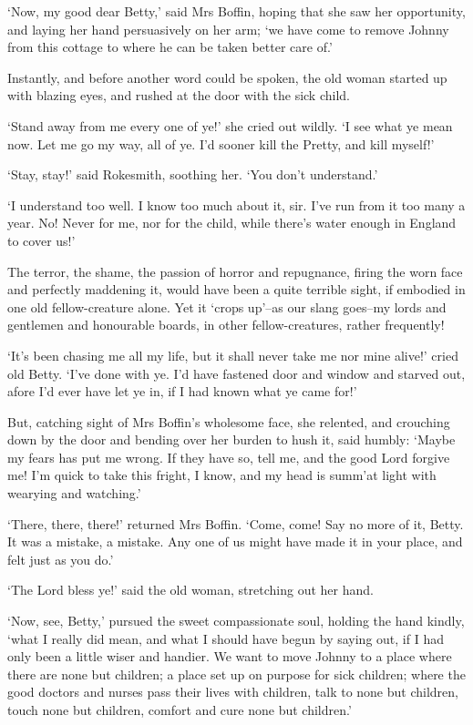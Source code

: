 ‘Now, my good dear Betty,’ said Mrs Boffin, hoping that she saw her
opportunity, and laying her hand persuasively on her arm; ‘we have come
to remove Johnny from this cottage to where he can be taken better care
of.’

Instantly, and before another word could be spoken, the old woman
started up with blazing eyes, and rushed at the door with the sick
child.

‘Stand away from me every one of ye!’ she cried out wildly. ‘I see what
ye mean now. Let me go my way, all of ye. I’d sooner kill the Pretty,
and kill myself!’

‘Stay, stay!’ said Rokesmith, soothing her. ‘You don’t understand.’

‘I understand too well. I know too much about it, sir. I’ve run from
it too many a year. No! Never for me, nor for the child, while there’s
water enough in England to cover us!’

The terror, the shame, the passion of horror and repugnance, firing the
worn face and perfectly maddening it, would have been a quite terrible
sight, if embodied in one old fellow-creature alone. Yet it ‘crops
up’--as our slang goes--my lords and gentlemen and honourable boards, in
other fellow-creatures, rather frequently!

‘It’s been chasing me all my life, but it shall never take me nor mine
alive!’ cried old Betty. ‘I’ve done with ye. I’d have fastened door and
window and starved out, afore I’d ever have let ye in, if I had known
what ye came for!’

But, catching sight of Mrs Boffin’s wholesome face, she relented, and
crouching down by the door and bending over her burden to hush it, said
humbly: ‘Maybe my fears has put me wrong. If they have so, tell me, and
the good Lord forgive me! I’m quick to take this fright, I know, and my
head is summ’at light with wearying and watching.’

‘There, there, there!’ returned Mrs Boffin. ‘Come, come! Say no more of
it, Betty. It was a mistake, a mistake. Any one of us might have made it
in your place, and felt just as you do.’

‘The Lord bless ye!’ said the old woman, stretching out her hand.

‘Now, see, Betty,’ pursued the sweet compassionate soul, holding the
hand kindly, ‘what I really did mean, and what I should have begun by
saying out, if I had only been a little wiser and handier. We want to
move Johnny to a place where there are none but children; a place set
up on purpose for sick children; where the good doctors and nurses pass
their lives with children, talk to none but children, touch none but
children, comfort and cure none but children.’

